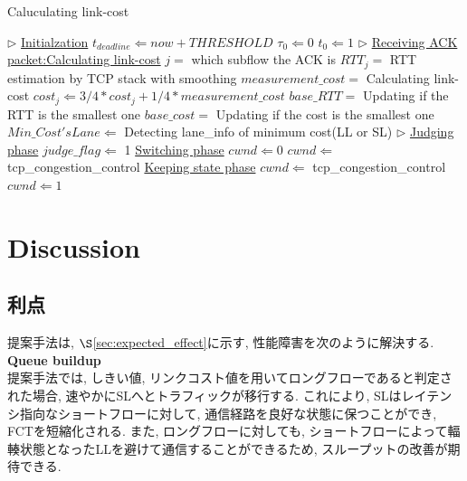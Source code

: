 \begin{algorithm}
\caption{Caluculating link-cost}
\label{alg1}
\begin{algorithmic}[1]
\STATE $\triangleright $ \underline{Initialzation}
\STATE $t_{deadline} \Leftarrow now + THRESHOLD$
\STATE $\tau_0 \Leftarrow 0$
\STATE $t_{0} \Leftarrow 1$
\STATE $\triangleright $ \underline{Receiving ACK packet:Calculating link-cost}
\STATE $j = $ which subflow the ACK is
\STATE $RTT_j = $ RTT estimation by TCP stack with smoothing
\STATE $measurement\_cost = $ Calculating link-cost
\STATE $cost_j \Leftarrow 3/4  \ast cost_j + 1/4 \ast measurement\_cost$
\STATE $base\_RTT = $ Updating if the RTT is the smallest one
\STATE $base\_cost = $ Updating if the cost is the smallest one
\STATE $Min\_Cost's Lane \Leftarrow$ Detecting lane\_info of minimum cost(LL
or SL)
\ENDFOR
\STATE $\triangleright $ \underline{Judging phase}
\STATE $judge\_flag \Leftarrow $ 1
\ENDIF
{}
\STATE {$\triangleright$} \underline{Switching phase}
    \STATE $cwnd \Leftarrow 0$
    \ELSE
    \STATE $cwnd \Leftarrow $ tcp\_congestion\_control
    \ENDIF
\ELSE
\STATE {$\triangleright$} \underline{Keeping state phase}
    \STATE $cwnd \Leftarrow $ tcp\_congestion\_control
    \ELSE
    \STATE $cwnd \Leftarrow 1$
    \ENDIF
\ENDIF
\end{algorithmic}
\end{algorithm}

\section{Discussion}

\subsection{利点}
提案手法は, $\S$\ref{sec:expected_effect}に示す, 性能障害を次のように解決する. \\
{\bf Queue buildup}\\
提案手法では, しきい値, リンクコスト値を用いてロングフローであると判定された場合, 速やかにSLへとトラフィックが移行する. 
これにより, SLはレイテンシ指向なショートフローに対して, 通信経路を良好な状態に保つことができ, FCTを短縮化される. 
また, ロングフローに対しても, ショートフローによって輻輳状態となったLLを避けて通信することができるため, スループットの改善が期待できる. 

